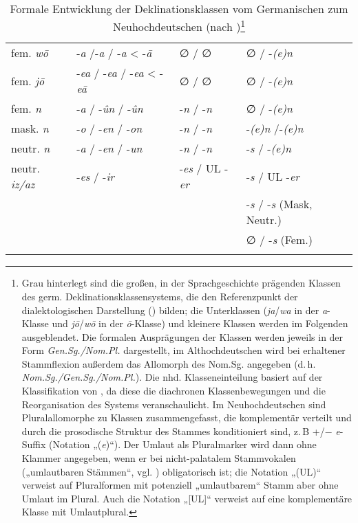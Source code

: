 \begin{table}
{\begin{tabular}{llll}
fem. \textit{wō} & -\textit{a} /-\textit{a} / -\textit{a} < -\textit{ā}& ∅ / ∅ & ∅ / -\textit{(e)n}\\
fem. \textit{jō} & {}-\textit{ea} / -\textit{ea} / -\textit{ea} < -\textit{eā} & ∅ / ∅ & ∅ / -\textit{(e)n}\\
\cellcolor{lsLightGray}fem. \textit{n} & {}-\textit{a} / -\textit{ûn} / -\textit{ûn} & {}-\textit{n} / -\textit{n} & ∅ / -\textit{(e)n}\\
\cellcolor{lsLightGray}mask. \textit{n} & {}-\textit{o} / -\textit{en} / -\textit{on} & -\textit{n} / -\textit{n} & {}-\textit{(e)n} /-\textit{(e)n}\\
\cellcolor{lsLightGray}neutr. \textit{n} & {}-\textit{a} / -\textit{en} / -\textit{un} & -\textit{n} / -\textit{n} & {}-\textit{s} / -\textit{(e)n}\\
\cellcolor{lsLightGray}neutr. \textit{iz/az} & {}-\textit{es} / -\textit{ir} & {}-\textit{es} / UL -\textit{er} & {}-\textit{s} / UL -\textit{er}\\
\multicolumn{3}{c}{} & {}-\textit{s} / -\textit{s} (Mask, Neutr.)\\
 &  &  & ∅ / -\textit{s} (Fem.)\\
\lspbottomrule
\end{tabular}}
\caption{Formale Entwicklung der Deklinationsklassen vom Germanischen zum Neuhochdeutschen (nach \citealt[94]{Kürschner2008a})\protect\footnote{Grau hinterlegt sind die großen, in der Sprachgeschichte prägenden Klassen des germ. Deklinationsklassensystems, die den Referenzpunkt der dialektologischen Darstellung () bilden; die Unterklassen (\textit{ja}/\textit{wa} in der \textit{a}{}-Klasse und \textit{jō}/\textit{wō} in der \textit{ō}{}-Klasse) und kleinere Klassen werden im Folgenden ausgeblendet. Die formalen Ausprägungen der Klassen werden jeweils in der Form \textit{Gen.Sg.\slash Nom.Pl.} dargestellt, im Althochdeutschen wird bei erhaltener Stammflexion außerdem das Allomorph des Nom.Sg. angegeben (d.\,h. \textit{Nom.Sg.\slash Gen.Sg.\slash Nom.Pl.}). Die nhd. Klasseneinteilung basiert auf der Klassifikation von \citet[94]{Kürschner2008a}, da diese die diachronen Klassenbewegungen und die Reorganisation des Systems veranschaulicht. Im Neuhochdeutschen sind Pluralallomorphe zu Klassen zusammengefasst, die komplementär verteilt und durch die prosodische Struktur des Stammes konditioniert sind, z.\,B +/$-$ \textit{e}{}-Suffix (Notation „(\textit{e})“). Der Umlaut als Pluralmarker wird dann ohne Klammer angegeben, wenn er bei nicht-palatalem Stammvokalen („umlautbaren Stämmen“, vgl. \citealt[94, FN 27]{Kürschner2008a}) obligatorisch ist; die Notation „(UL)“ verweist auf Pluralformen mit potenziell „umlautbarem“ Stamm aber ohne Umlaut im Plural. Auch die Notation „[UL]“ verweist auf eine komplementäre Klasse mit Umlautplural.}\label{tab:9}}
\end{table}


